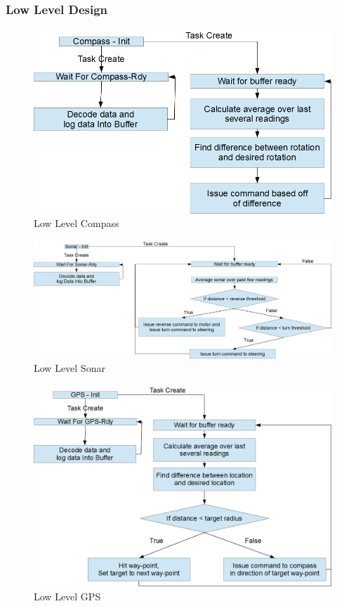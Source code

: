 \documentclass[final,letterpaper,singleside,12pt]{article}
\begin{document}
\pagebreak

\subsubsection{Low Level Design} %
\label{ssub:low_level_design}
\begin{figure}[H]
\center
\includegraphics[scale=0.2]{LLD_Comp.png}
\caption{Low Level Compass}
\label{fig:ll_comp}
\end{figure}
\begin{figure}[H]
\center
\includegraphics[scale=0.2]{LLD_Sonar.png}
\caption{Low Level Sonar}
\label{fig:ll_sonar}
\end{figure}
\begin{figure}[H]
\center
\includegraphics[scale=0.2]{LLD_GPS.png}
\caption{Low Level GPS}
\label{fig:ll_gps}
\end{figure}
\end{document}
